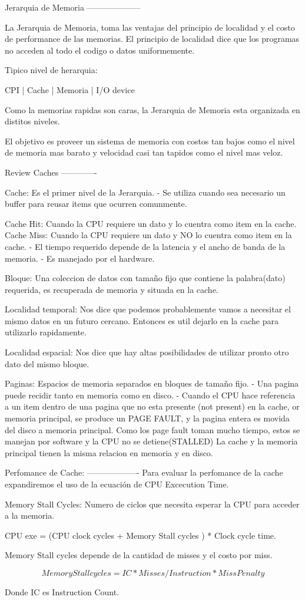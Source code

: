 \documentclass{article}
\begin{document}
Jerarquia de Memoria
--------------------

La Jerarquia de Memoria, toma las ventajas del principio de localidad y el costo de performance de las memorias.
El principio de localidad dice que los programas no acceden al todo el codigo o datos uniformemente.

Tipico nivel de herarquia:

    CPI   |   Cache   |  Memoria  | I/O device


Como la memorias rapidas son caras, la Jerarquia de Memoria esta organizada en distitos niveles.

El objetivo es proveer un sistema de memoria con costos tan bajos como el nivel de memoria mas barato y
velocidad casi tan tapidos como el nivel mas veloz.

Review Caches
-------------

Cache: Es el primer nivel de la Jerarquia. 
    - Se utiliza cuando sea necesario un buffer para reusar items que ocurren comunmente.

Cache Hit: Cuando la CPU requiere un dato y lo cuentra como item en la cache.
Cache Miss: Cuando la CPU requiere un dato y NO lo cuentra como item en la cache.
    - El tiempo requerido depende de la latencia y el ancho de banda de la memoria.
    - Es manejado por el hardware.

Bloque: Una coleccion de datos con tamaño fijo que contiene la palabra(dato) requerida, es recuperada
de memoria y situada en la cache.

Localidad temporal: Nos dice que podemos probablemente vamos a necesitar el mismo datos en un futuro cercano.
    Entonces es util dejarlo en la cache para utilizarlo rapidamente.

Localidad espacial: Nos dice que hay altas posibilidades de utilizar pronto otro dato del mismo bloque.

Paginas: Espacios de memoria separados en bloques de tamaño fijo. 
    - Una pagina puede recidir tanto en memoria como en disco.
    - Cuando el CPU hace referencia a un item dentro de una pagina que no esta presente (not present)
      en la cache, or memoria principal, se produce un PAGE FAULT, y la pagina entera es movida
      del disco a memoria principal.
      Como los page fault toman mucho tiempo, estos se manejan por software y la CPU no se detiene(STALLED)
      La cache y la memoria principal tienen la misma relacion en memoria y en disco.


Perfomance de Cache:
-------------------
    Para evaluar la perfomance de la cache expandiremos el uso de la ecuación de CPU Excecution Time.

    Memory Stall Cycles: Numero de ciclos que necesita esperar la CPU para acceder a la memoria.

    CPU exe = (CPU clock cycles + Memory Stall cycles ) * Clock cycle time.
    
    Memory Stall cycles depende de la cantidad de misses y el costo por miss.

    \begin{equation}
        Memory Stall cycles = IC * Misses/Instruction * Miss Penalty
    \end{equation}

        Donde IC es Instruction Count. 
\end{document}

